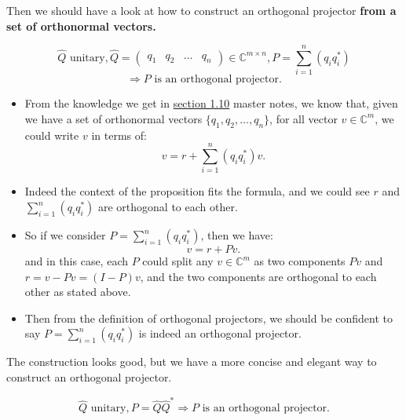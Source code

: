 \noindent Then we should have a look at how to construct an orthogonal projector \textbf{from a set of orthonormal vectors.} 

\begin{prop}
  \[
    \hat{Q} \text{ unitary}, \hat{Q} = \begin{pmatrix} q_1 & q_2 & \ldots & q_n \end{pmatrix} \in \mathbb{C}^{m \times n}, P = \sum_{i=1}^{n} (q_iq_i^{*}) 
  \]
  \[
    \Rightarrow P \text{ is an orthogonal projector} 
  .\]
\end{prop}
\begin{itemize}
\item From the knowledge we get in \href{https://comp-lin-alg.github.io/L1_preliminaries.html#constructing-orthogonal-projectors-from-sets-of-orthonormal-vectors}{section 1.10} master notes, we know that, given we have a set of orthonormal vectors $\{q_1, q_2, \ldots, q_n\}$, for all vector $v \in \mathbb{C}^{m}$, we could write $v$ in terms of:
  \[
    v = r + \sum_{i = 1}^{n} (q_iq_i^{*})v
  .\] 
\item Indeed the context of the proposition fits the formula, and we could see \(r\) and \(\sum_{i=1}^{n} (q_iq_i^{*})\) are orthogonal to each other.  
  \item So if we consider $P = \sum_{i=1}^{n} (q_iq_i^{*})$, then we have:
    \[
    v = r + Pv
    .\] 
    and in this case, each \(P\) could split any \(v \in \mathbb{C}^{m}\) as two components \(Pv\) and \(r = v - Pv = (I - P)v\), and the two components are orthogonal to each other as stated above. 
  \item Then from the definition of orthogonal projectors, we should be confident to say \(P = \sum_{i=1}^{n} (q_iq_i^{*})\) is indeed an orthogonal projector.  
\end{itemize}
The construction looks good, but we have a more concise and elegant way to construct an orthogonal projector.
\newpage
\begin{corollary}
  \[
  \hat{Q} \text{ unitary}, P = \hat{Q}\hat{Q}^{*} \Rightarrow P \text{ is an orthogonal projector}
  .\] 
\end{corollary}
